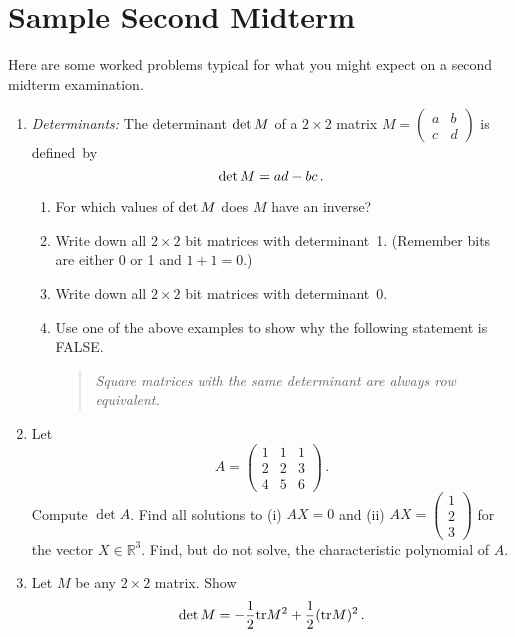 \chapter{Sample Second Midterm}

Here are some worked problems typical for what you might expect on a second midterm examination.
\label{sample2}

\begin{enumerate}

\item
{\itshape Determinants:} The determinant ${\rm det}\, M$ of a $2\times 2$ matrix $M=\begin{pmatrix}a&b\\c&d\end{pmatrix}$ is defined~by
\[
{\rm det}\,  M =ad -bc\, .
\] 
\begin{enumerate}
\item For which values of ${\rm det}\,  M$ does $M$ have an inverse?
\item Write down all $2\times 2$ bit matrices with determinant~1. (Remember bits are either 0 or 1 and $1+1=0$.)
\item Write down all $2\times 2$ bit matrices with determinant~0.
\item Use one of the above examples to show why the following statement is FALSE.
\begin{quote}
{\itshape Square matrices with the same determinant are always row equivalent.}
\end{quote}
\end{enumerate}



\item
Let 
\[
A=\left(\begin{array}{ccc}1&1&1\\[2mm]2&2&3\\[2mm]4&5&6\end{array}\right)\, .
\]
Compute $\det A$.
Find all solutions to (i) $A X =  0$ and (ii) $A X=\left(
\begin{array}{c}1\\2\\3\end{array}\right)$ for the vector $X\in \mathbb R^3$. Find, but do not solve,
the characteristic polynomial of $A$.

\item
Let $M$ be any $2\times 2$ matrix. Show
\[
\det M = -\frac 12 {\rm tr} M^2 + \frac 12 ({\rm tr} M)^2\, .
\]


\end{enumerate}
